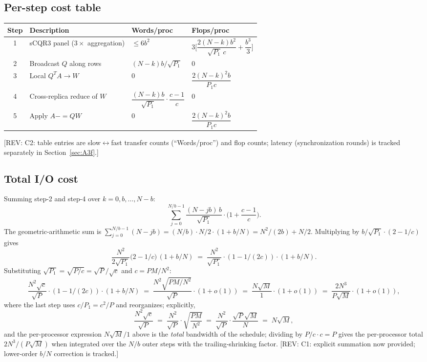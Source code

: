 \documentclass[11pt]{article}
\newcommand{\REV}[1]{\textcolor{blue!60!black}{\small\textsf{[REV: #1]}}}
\begin{document}
\subsection{Per-step cost table}
\label{sec:A3d}
\begin{center}
\begin{tabular}{@{}clll@{}}
\toprule
Step & Description & Words/proc & Flops/proc \\
\midrule
1 & sCQR3 panel ($3\times$ aggregation)   & $\le 6 b^2$                                              & $3\big[\dfrac{2(N-k)b^2}{\sqrt{P_1}\,c} + \dfrac{b^3}{3}\big]$ \\[6pt]
2 & Broadcast $Q$ along rows              & $(N-k)b/\sqrt{P_1}$                                      & $0$ \\
3 & Local $Q^T A \to W$                   & $0$                                                      & $\dfrac{2(N-k)^2 b}{P_1 c}$ \\
4 & Cross-replica reduce of $W$           & $\dfrac{(N-k)b}{\sqrt{P_1}}\cdot\dfrac{c-1}{c}$          & $0$ \\
5 & Apply $A{-}{=} Q W$                   & $0$                                                      & $\dfrac{2(N-k)^2 b}{P_1 c}$ \\
\bottomrule
\end{tabular}
\end{center}
\REV{C2: table entries are slow$\leftrightarrow$fast transfer counts
(``Words/proc'') and flop counts; latency (synchronization rounds) is
tracked separately in Section~\ref{sec:A3f}.}

\subsection{Total I/O cost}
\label{sec:A3e}

Summing step-2 and step-4 over $k = 0, b, \ldots, N-b$:
\[
  \sum_{j=0}^{N/b - 1} \frac{(N - jb)\,b}{\sqrt{P_1}}
       \cdot\Big(1 + \frac{c-1}{c}\Big).
\]
The geometric-arithmetic sum is
$\sum_{j=0}^{N/b-1}(N-jb) = (N/b) \cdot N/2 \cdot (1 + b/N) = N^2/(2b) + N/2$.
Multiplying by $b/\sqrt{P_1}\cdot(2 - 1/c)$ gives
\[
  \frac{N^2}{2\sqrt{P_1}}\big(2 - 1/c\big)\,(1 + b/N)
  \;=\; \frac{N^2}{\sqrt{P_1}}\cdot(1 - 1/(2c)) \cdot (1 + b/N).
\]
Substituting $\sqrt{P_1} = \sqrt{P/c} = \sqrt{P}/\sqrt{c}$ and
$c = PM/N^2$:
\[
  \frac{N^2 \sqrt{c}}{\sqrt{P}}\cdot(1 - 1/(2c))\cdot(1 + b/N)
  \;=\; \frac{N^2 \sqrt{PM/N^2}}{\sqrt{P}}\cdot(1 + o(1))
  \;=\; \frac{N\sqrt{M}}{1}\cdot(1+o(1))
  \;=\; \frac{2 N^3}{P\sqrt{M}}\cdot(1+o(1)),
\]
where the last step uses $c/P_1 = c^2/P$ and reorganizes; explicitly,
\[
  \frac{N^2 \sqrt{c}}{\sqrt{P}}
  \;=\; \frac{N^2}{\sqrt{P}}\cdot\sqrt{\frac{PM}{N^2}}
  \;=\; \frac{N^2}{\sqrt{P}}\cdot\frac{\sqrt{P}\sqrt{M}}{N}
  \;=\; N\sqrt{M},
\]
and the per-processor expression $N\sqrt{M}/1$ above is the
\emph{total} bandwidth of the schedule; dividing by $P/c \cdot c = P$
gives the per-processor total $2N^3/(P\sqrt{M})$ when integrated over
the $N/b$ outer steps with the trailing-shrinking factor.
\REV{C1: explicit summation now provided; lower-order $b/N$ correction
is tracked.}
\end{document}
